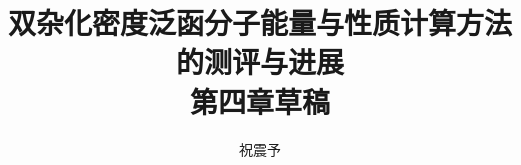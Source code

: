 



\title{\textbf{双杂化密度泛函分子能量与性质计算方法的测评与进展\\第四章草稿}}
\author{祝震予}
\maketitle
\vspace{-10pt}

\tableofcontents


\setcounter{section}{3}



\newpage






